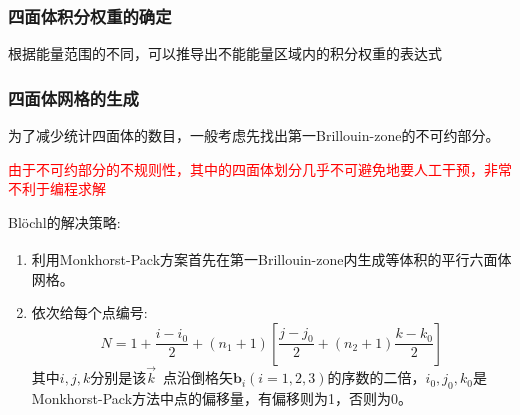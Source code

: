 \documentclass[cjk,slidestop,compress,mathserif,blue]{beamer}
\newcommand{\upcite}[1]{\hspace{0ex}\textsuperscript{\cite{#1}}} %
\begin{document}
\frame
{
	\frametitle{四面体积分权重的确定}
\begin{figure}[h!]
\centering
{}
	\hfill
{}
\end{figure}
根据能量范围的不同，可以推导出不能能量区域内的积分权重的表达式%
}

\frame
{
	\frametitle{四面体网格的生成}
	为了减少统计四面体的数目，一般考虑先找出第一\textrm{Brillouin-zone}的不可约部分。

	\textcolor{red}{由于不可约部分的不规则性，其中的四面体划分几乎不可避免地要人工干预，非常不利于编程求解}

	\textrm{Bl\"ochl}的解决策略:
\begin{enumerate}
	\item 利用\textrm{Monkhorst-Pack}方案\upcite{PRB13-5188_1976}首先在第一\textrm{Brillouin-zone}内生成等体积的平行六面体网格。
	\item 依次给每个点编号:
\begin{displaymath}
	\boxed{N=1+\dfrac{i-i_0}2+(n_1+1)\left[\dfrac{j-j_0}2+(n_2+1)\dfrac{k-k_0}2\right]}
\end{displaymath}
其中$i,j,k$分别是该$\vec k$~点沿倒格矢$\mathbf{b}_i(i=1,2,3)$的序数的二倍，$i_0,j_0,k_0$是\textrm{Monkhorst-Pack}方法中点的偏移量，有偏移则为1，否则为0。
\end{enumerate}
}
\end{document}
